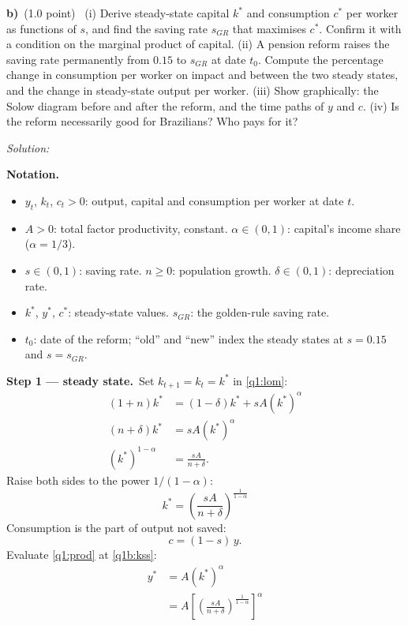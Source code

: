\documentclass[11pt,a4paper]{article}
\newif\ifsolucoes
\newcommand{\espacoresol}{6cm}
\newcommand{\parte}[2]{\par\Needspace{6\baselineskip}\medskip\noindent\textbf{#1)}~(#2)~}
\newcommand{\resolespaco}{\ifsolucoes\else\par\textit{Solution:}\vspace{\espacoresol}\par\fi}
\newcommand{\passo}[2]{\par\smallskip\noindent\textbf{Step #1.}~#2}
\newenvironment{notacao}{\par\smallskip\noindent\textbf{Notation.}\begin{itemize}[leftmargin=1.4em,topsep=1pt,itemsep=0pt]\small}{\end{itemize}}
\begin{document}
\parte{b}{1.0 point} (i) Derive steady-state capital $k^{*}$ and consumption $c^{*}$ per worker as functions of
$s$, and find the saving rate $s_{GR}$ that maximises $c^{*}$. Confirm it with a condition on the marginal
product of capital. (ii) A pension reform raises the saving rate permanently from $0.15$ to $s_{GR}$ at date
$t_0$. Compute the percentage change in consumption per worker on impact and between the two steady states,
and the change in steady-state output per worker. (iii) Show graphically: the Solow diagram before and after
the reform, and the time paths of $y$ and $c$. (iv) Is the reform necessarily good for Brazilians? Who pays for
it?
\resolespaco
\begin{sol}
\begin{notacao}
\item $y_t$, $k_t$, $c_t>0$: output, capital and consumption per worker at date $t$.
\item $A>0$: total factor productivity, constant. $\alpha\in(0,1)$: capital's income share ($\alpha=1/3$).
\item $s\in(0,1)$: saving rate. $n\ge0$: population growth. $\delta\in(0,1)$: depreciation rate.
\item $k^*$, $y^*$, $c^*$: steady-state values. $s_{GR}$: the golden-rule saving rate.
\item $t_0$: date of the reform; ``old'' and ``new'' index the steady states at $s=0.15$ and $s=s_{GR}$.
\end{notacao}
\passo{1 --- steady state}{Set $k_{t+1}=k_t=k^*$ in \eqref{q1:lom}:
\begin{align}
(1+n)k^* &= (1-\delta)k^*+sA(k^*)^{\alpha}\nonumber\\
(n+\delta)k^* &= sA(k^*)^{\alpha}\nonumber\\
(k^*)^{1-\alpha} &= \frac{sA}{n+\delta}. \nonumber
\end{align}
Raise both sides to the power $1/(1-\alpha)$:
\begin{equation}
\boxed{k^*=\left(\frac{sA}{n+\delta}\right)^{\frac{1}{1-\alpha}}} \label{q1b:kss}
\end{equation}
Consumption is the part of output not saved:
\begin{equation}
c=(1-s)\,y. \label{q1b:c}
\end{equation}
Evaluate \eqref{q1:prod} at \eqref{q1b:kss}:
\begin{align}
y^* &= A(k^*)^{\alpha}\nonumber\\
&= A\left[\left(\frac{sA}{n+\delta}\right)^{\frac{1}{1-\alpha}}\right]^{\alpha}\nonumber\\

\end{align}}
\end{sol}
\end{document}
